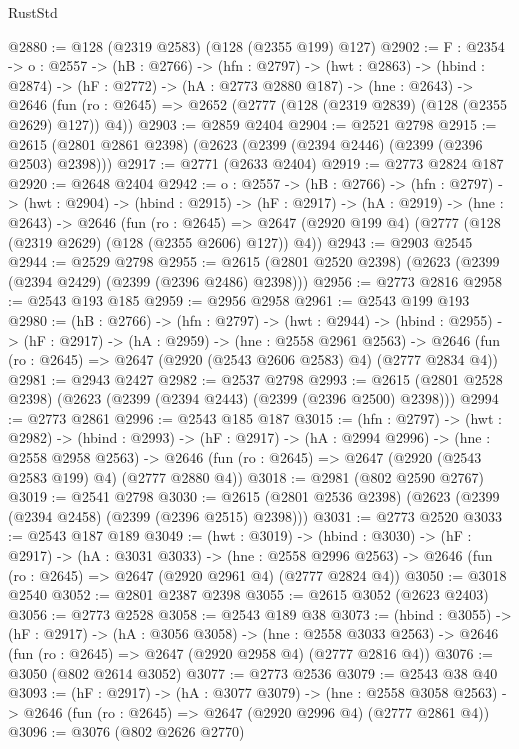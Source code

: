 \begin{lexlean}{RustStd}
\begin{coremodule}
{\begin{coremodule}
{{{{{@2880 := @128 (@2319 @2583) (@128 (@2355 @199) @127)
@2902 := {F : @2354} ->
  {o : @2557} ->
  (hB : @2766) ->
  (hfn : @2797) ->
  (hwt : @2863) ->
  (hbind : @2874) ->
  (hF : @2772) ->
  (hA : @2773 @2880 @187) ->
  (hne : @2643) ->
  @2646 (fun (ro : @2645) => @2652 (@2777 (@128 (@2319 @2839) (@128 (@2355 @2629) @127)) @4))
@2903 := @2859 @2404
@2904 := @2521 @2798
@2915 := @2615 (@2801 @2861 @2398) (@2623 (@2399 (@2394 @2446) (@2399 (@2396 @2503) @2398)))
@2917 := @2771 (@2633 @2404)
@2919 := @2773 @2824 @187
@2920 := @2648 @2404
@2942 := {o : @2557} ->
  (hB : @2766) ->
  (hfn : @2797) ->
  (hwt : @2904) ->
  (hbind : @2915) ->
  (hF : @2917) ->
  (hA : @2919) ->
  (hne : @2643) ->
  @2646
    (fun (ro : @2645) =>
    @2647 (@2920 @199 @4) (@2777 (@128 (@2319 @2629) (@128 (@2355 @2606) @127)) @4))
@2943 := @2903 @2545
@2944 := @2529 @2798
@2955 := @2615 (@2801 @2520 @2398) (@2623 (@2399 (@2394 @2429) (@2399 (@2396 @2486) @2398)))
@2956 := @2773 @2816
@2958 := @2543 @193 @185
@2959 := @2956 @2958
@2961 := @2543 @199 @193
@2980 := (hB : @2766) ->
  (hfn : @2797) ->
  (hwt : @2944) ->
  (hbind : @2955) ->
  (hF : @2917) ->
  (hA : @2959) ->
  (hne : @2558 @2961 @2563) ->
  @2646 (fun (ro : @2645) => @2647 (@2920 (@2543 @2606 @2583) @4) (@2777 @2834 @4))
@2981 := @2943 @2427
@2982 := @2537 @2798
@2993 := @2615 (@2801 @2528 @2398) (@2623 (@2399 (@2394 @2443) (@2399 (@2396 @2500) @2398)))
@2994 := @2773 @2861
@2996 := @2543 @185 @187
@3015 := (hfn : @2797) ->
  (hwt : @2982) ->
  (hbind : @2993) ->
  (hF : @2917) ->
  (hA : @2994 @2996) ->
  (hne : @2558 @2958 @2563) ->
  @2646 (fun (ro : @2645) => @2647 (@2920 (@2543 @2583 @199) @4) (@2777 @2880 @4))
@3018 := @2981 (@802 @2590 @2767)
@3019 := @2541 @2798
@3030 := @2615 (@2801 @2536 @2398) (@2623 (@2399 (@2394 @2458) (@2399 (@2396 @2515) @2398)))
@3031 := @2773 @2520
@3033 := @2543 @187 @189
@3049 := (hwt : @3019) ->
  (hbind : @3030) ->
  (hF : @2917) ->
  (hA : @3031 @3033) ->
  (hne : @2558 @2996 @2563) -> @2646 (fun (ro : @2645) => @2647 (@2920 @2961 @4) (@2777 @2824 @4))
@3050 := @3018 @2540
@3052 := @2801 @2387 @2398
@3055 := @2615 @3052 (@2623 @2403)
@3056 := @2773 @2528
@3058 := @2543 @189 @38
@3073 := (hbind : @3055) ->
  (hF : @2917) ->
  (hA : @3056 @3058) ->
  (hne : @2558 @3033 @2563) -> @2646 (fun (ro : @2645) => @2647 (@2920 @2958 @4) (@2777 @2816 @4))
@3076 := @3050 (@802 @2614 @3052)
@3077 := @2773 @2536
@3079 := @2543 @38 @40
@3093 := (hF : @2917) ->
  (hA : @3077 @3079) ->
  (hne : @2558 @3058 @2563) -> @2646 (fun (ro : @2645) => @2647 (@2920 @2996 @4) (@2777 @2861 @4))
@3096 := @3076 (@802 @2626 @2770)
}}}}}
\end{coremodule}}
\end{coremodule}
\end{lexlean}
